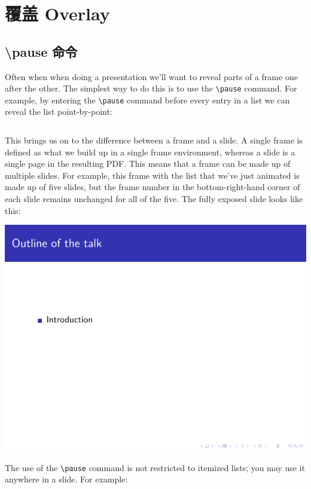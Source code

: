 \begin{column}{0.5\textwidth}
\section{覆盖 Overlay}

\subsection{{\ttfamily \textbackslash pause} 命令}

Often when when doing a presentation we'll want to reveal parts of a frame one after the other. The simplest way to do this is to use the \verb|\pause| command. For example, by entering the \verb|\pause| command before every entry in a list we can reveal the list point-by-point:

\inputminted[linenos=true]{latex}{examples/beamer/overlay-pause1.tex}

This brings us on to the difference between a frame and a slide. A single frame is defined as what we build up in a single frame environment, whereas a slide is a single page in the resulting PDF. This means that a frame can be made up of multiple slides. For example, this frame with the list that we've just animated is made up of five slides, but the frame number in the bottom-right-hand corner of each slide remains unchanged for all of the five.
The fully exposed slide looks like this:

\includegraphics[page=5]{examples/beamer/overlay-pause1.pdf}

The use of the \verb|\pause| command is not restricted to itemized lists; you may use it anywhere in a slide. For example:


\end{column}
